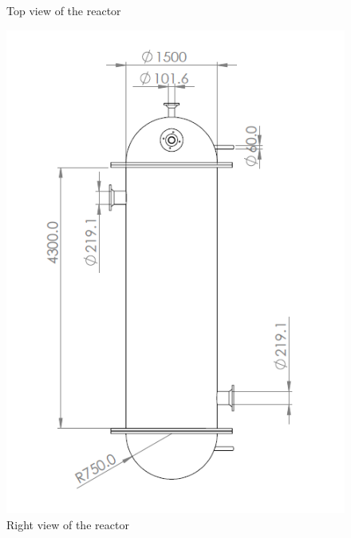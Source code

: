 \begin{figure}[h]
\begin{minipage}[t]{0.4\linewidth}
        \caption{Top view of the reactor}
        \label{fig:reactortop}
    \end{minipage}
\end{figure}
\begin{figure}
    \centering
    \includegraphics[width=0.49\linewidth]{chapters/2-reaction/figures/FYD reactor right view with calc.PNG}
    \caption{Right view of the reactor}
    \label{fig:reactorright}
\end{figure}

